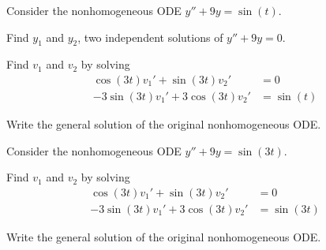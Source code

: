 \begin{applicationActivities}
\begin{observation}
\end{observation}

\begin{activity}{15}
Consider the nonhomogeneous ODE \(y''+9y=\sin(t)\).
\vfill
\begin{subactivity}
Find \(y_1\) and \(y_2\), two independent solutions of \(y''+9y=0\).
\end{subactivity}
\begin{subactivity}
Find \(v_1\) and \(v_2\) by solving
\begin{alignat*}{2}
\cos(3t) v_1' + \sin(3t) v_2'&=0 \\
-3\sin(3t) v_1' + 3\cos(3t) v_2'&=\sin(t)
\end{alignat*}
\end{subactivity}
\begin{subactivity}
Write the general solution of the original nonhomogeneous ODE.
\end{subactivity}
\end{activity}

\begin{activity}{10}
Consider the nonhomogeneous ODE \(y''+9y=\sin(3t)\).
\vfill
\begin{subactivity}
Find \(v_1\) and \(v_2\) by solving
\begin{alignat*}{2}
\cos(3t) v_1' + \sin(3t) v_2'&=0 \\
-3\sin(3t) v_1' + 3\cos(3t) v_2'&=\sin(3t)
\end{alignat*}
\end{subactivity}
\begin{subactivity}
Write the general solution of the original nonhomogeneous ODE.
\end{subactivity}
\end{activity}

\end{applicationActivities}
